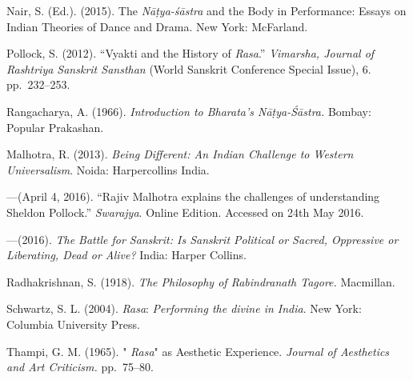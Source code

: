\begin{thebibliography}{99}
Nair, S. (Ed.). (2015). The \textsl{Nāṭya-śāstra} and the Body in Performance: Essays on Indian Theories of Dance and Drama. New York: McFarland.

Pollock, S. (2012). “Vyakti and the History of \textsl{Rasa}.” \textsl{Vimarsha, Journal of Rashtriya Sanskrit Sansthan} (World Sanskrit Conference Special Issue), 6. pp.~232--253.

Rangacharya, A. (1966). \textsl{Introduction to Bharata's Nāṭya-Śāstra.} Bombay: Popular Prakashan.

Malhotra, R. (2013). \textsl{Being Different: An Indian Challenge to Western Universalism}. Noida: Harpercollins India.

---\kern3pt(April 4, 2016). “Rajiv Malhotra explains the challenges of understanding Sheldon Pollock.” \textsl{Swarajya}. Online Edition. Accessed on 24th May 2016.

---\kern3pt(2016). \textsl{The Battle for Sanskrit: Is Sanskrit Political or Sacred, Oppressive or Liberating, Dead or Alive?} India: Harper Collins.

Radhakrishnan, S. (1918). \textsl{The Philosophy of Rabindranath Tagore.} Macmillan. 

Schwartz, S. L. (2004). \textsl{Rasa}: \textsl{Performing the divine in India}. New York: Columbia University Press. 

Thampi, G. M. (1965). " \textsl{Rasa}" as Aesthetic Experience. \textsl{Journal of Aesthetics and Art Criticism.} pp.~75--80.
\end{thebibliography}

\theendnotes 
